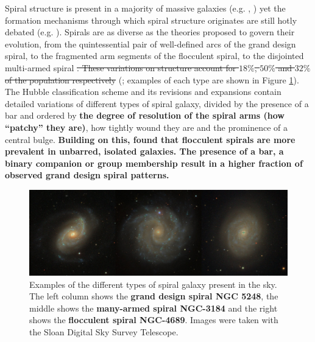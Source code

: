 
Spiral structure is present in a majority of massive galaxies (e.g. \citealt{1989gadv.book..151B}, \citealt{2008MNRAS.389.1179L}) yet the formation mechanisms through which spiral structure originates are still hotly debated (e.g. \citealt{2014PASA...31...35D}). Spirals are as diverse as the theories proposed to govern their evolution, from the quintessential pair of well-defined arcs of the grand design spiral, to the fragmented arm segments of the flocculent spiral, to the disjointed multi-armed spiral
\sout{. These variations on structure account for $18\%$, $50\%$ and $32\%$ of the population respectively}
(\citealt{2011ApJ...737...32E}; examples of each type are shown in Figure \ref{fig:spiral-galaxy-types}). The Hubble classification scheme \citep{1926ApJ....64..321H} and its revisions and expansions \citep{1961hag..book.....S,1991rc3..book.....D} contain detailed variations of different types of spiral galaxy, divided by the presence of a bar and ordered by \textbf{the degree of resolution of the spiral arms (how ``patchy” they are)}, how tightly wound they are and the prominence of a central bulge. \textbf{Building on this, \citet{1982MNRAS.201.1021E} found that flocculent spirals are more prevalent in unbarred, isolated galaxies. The presence of a bar, a binary companion or group membership result in a higher fraction of observed grand design spiral patterns.}

\begin{figure}
  \includegraphics[width=15cm]{plots/galaxy_types.jpg}
  \caption{Examples of the different types of spiral galaxy present in the sky. The left column shows the \textbf{grand design spiral NGC 5248}, the middle shows the \textbf{many-armed spiral NGC-3184} and the right shows the \textbf{flocculent spiral NGC-4689}. Images were taken with the Sloan Digital Sky Survey Telescope.}
  \label{fig:spiral-galaxy-types}
\end{figure}


